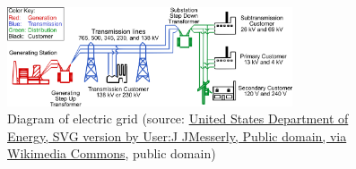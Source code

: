 \begin{frame}
\begin{columns}
\begin{column}{0.525\textwidth}
\begin{itemize}
\begin{figure}
				\centering
				\includegraphics[width=0.75\textwidth]{fig/lec04/Electricity_grid_simple.png}
				\caption{Diagram of electric grid (source: \href{https://commons.wikimedia.org/wiki/File:Electricity_grid_simple-_North_America.svg}{United States Department of Energy, SVG version by User:J JMesserly, Public domain, via Wikimedia Commons}, public domain)}
			\end{figure}
        \end{itemize}

		\end{column}
		\end{columns}
\end{frame}


